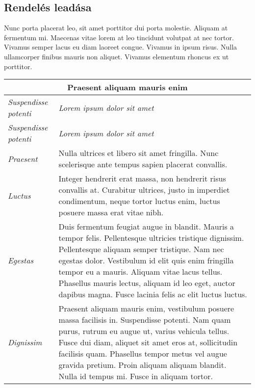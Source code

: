 \subsection{Rendelés leadása} %

Nunc porta placerat leo, sit amet porttitor dui porta molestie. Aliquam at fermentum mi. Maecenas vitae lorem at leo tincidunt volutpat at nec tortor. Vivamus semper lacus eu diam laoreet congue. Vivamus in ipsum risus. Nulla ullamcorper finibus mauris non aliquet. Vivamus elementum rhoncus ex ut porttitor.

\begin{center}
	\begin{longtable}{ | p{} | p{} | }
		
		\hline
		\multicolumn{2}{|c|}{\textbf{Praesent aliquam mauris enim}}
		\\ \hline
		
		\emph{Suspendisse potenti} & \emph{Lorem ipsum dolor sit amet}
		\\ \hline \hline
		\endfirsthead %
		
		\hline
		\emph{Suspendisse potenti} & \emph{Lorem ipsum dolor sit amet}
		\\ \hline \hline
		\endhead %
		
		\hline
		\endfoot %
		
		\endlastfoot %
		
		\emph{Praesent}
		& Nulla ultrices et libero sit amet fringilla. Nunc scelerisque ante tempus sapien placerat convallis.
		\\ \hline
		
		\emph{Luctus}
		& Integer hendrerit erat massa, non hendrerit risus convallis at. Curabitur ultrices, justo in imperdiet condimentum, neque tortor luctus enim, luctus posuere massa erat vitae nibh.
		\\ \hline
		
		\emph{Egestas}
		& Duis fermentum feugiat augue in blandit. Mauris a tempor felis. Pellentesque ultricies tristique dignissim. Pellentesque aliquam semper tristique. Nam nec egestas dolor. Vestibulum id elit quis enim fringilla tempor eu a mauris. Aliquam vitae lacus tellus. Phasellus mauris lectus, aliquam id leo eget, auctor dapibus magna. Fusce lacinia felis ac elit luctus luctus.
		\\ \hline
		
		\emph{Dignissim}
		& Praesent aliquam mauris enim, vestibulum posuere massa facilisis in. Suspendisse potenti. Nam quam purus, rutrum eu augue ut, varius vehicula tellus. Fusce dui diam, aliquet sit amet eros at, sollicitudin facilisis quam. Phasellus tempor metus vel augue gravida pretium. Proin aliquam aliquam blandit. Nulla id tempus mi. Fusce in aliquam tortor.
		\\ \hline
		

\end{longtable}
\end{center}
